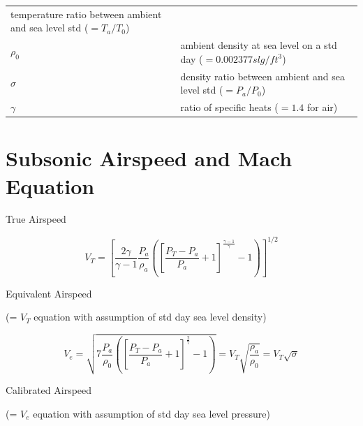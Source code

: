 \documentclass[
]{book}
\begin{document}
\begin{longtable}[]{@{}ll@{}}
\begin{minipage}[t]{0.72\columnwidth}
temperature ratio between ambient and sea level std (\(=T_a/T_0\))\strut
\end{minipage}\tabularnewline
\begin{minipage}[t]{0.22\columnwidth}\raggedright
\(\rho_0\)\strut
\end{minipage} & \begin{minipage}[t]{0.72\columnwidth}\raggedright
ambient density at sea level on a std day (\(=0.002 377 slg/ft^3\))\strut
\end{minipage}\tabularnewline
\begin{minipage}[t]{0.22\columnwidth}\raggedright
\(\sigma\)\strut
\end{minipage} & \begin{minipage}[t]{0.72\columnwidth}\raggedright
density ratio between ambient and sea level std (\(=P_a/P_0\))\strut
\end{minipage}\tabularnewline
\begin{minipage}[t]{0.22\columnwidth}\raggedright
\(\gamma\)\strut
\end{minipage} & \begin{minipage}[t]{0.72\columnwidth}\raggedright
ratio of specific heats (\(=1.4\) for air)\strut
\end{minipage}\tabularnewline
\bottomrule
\end{longtable}

\hypertarget{subsonic-airspeed-and-mach-equation}{%
\section{Subsonic Airspeed and Mach Equation}\label{subsonic-airspeed-and-mach-equation}}

True Airspeed

\[V_{T} = \left\lbrack \frac{2\gamma}{\gamma-1} \frac{P_a}{\rho_a} \left( \left\lbrack \frac{P_T - P_a}{P_a} + 1 \right\rbrack^\frac{\gamma-1}{\gamma} - 1 \right) \right\rbrack ^{1/2}\]

Equivalent Airspeed

(= \(V_T\) equation with assumption of std day sea level density)

\[V_{e} = \sqrt{7\frac{P_{a}}{\rho_0}\left( \left\lbrack \frac{P_{T} - P_{a}}{P_{a}} + 1 \right\rbrack^{\frac{2}{7}} - 1 \right)} = V_{T}\sqrt{\frac{\rho_{a}}{\rho_0}} = V_{T}\sqrt{\sigma}\]

Calibrated Airspeed

(= \(V_e\) equation with assumption of std day sea level pressure)
\end{document}
